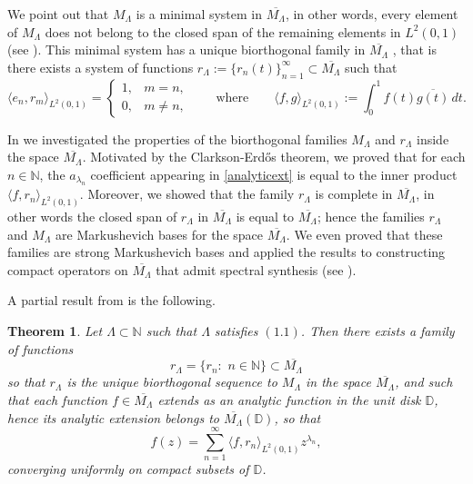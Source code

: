 \documentclass[11pt, a4paper]{article}
\newtheorem{theorem}{Theorem}[section]
\begin{document}
We point out that $M_{\Lambda}$ is a minimal system in $\overline{M_{\Lambda}}$, in other words,
every element of $M_{\Lambda}$ does not belong to the closed span of the remaining elements in $L^2 (0,1)$
(see \cite[Proposition 6.1.4]{Gurariy}). This minimal system has a unique biorthogonal family in $\overline{M_{\Lambda}}$ ,
that is there exists a system of functions
$r_{\Lambda}:=\{r_n(t)\}_{n=1}^{\infty}\subset \overline{M_{\Lambda}}$ such that
\[
\langle e_n, r_m\rangle_{L^2 (0,1)} =\begin{cases} 1, & m=n, \\  0, & m\not=n,\end{cases}\qquad \text{where}\qquad
\langle f, g\rangle_{L^2 (0,1)}:=\int_{0}^{1} f(t)\overline{g(t)}\, dt.
\]

In \cite[Theorem 1]{Zikkos2026Acta} we investigated the properties of the biorthogonal families $M_{\Lambda}$ and $r_{\Lambda}$
inside the space $\overline{M_{\Lambda}}$. Motivated by the Clarkson-Erd\H{o}s theorem, we proved that
for each $n\in\mathbb{N}$, the $a_{\lambda_n}$ coefficient appearing in \eqref{analyticext} is equal to the
inner product $\langle f, r_{n} \rangle_{L^2 (0,1)}$.
Moreover, we showed that the family  $r_{\Lambda}$ is complete in $\overline{M_{\Lambda}}$,
in other words the closed span of $r_{\Lambda}$ in $\overline{M_{\Lambda}}$ is equal to $\overline{M_{\Lambda}}$; hence the families
$r_{\Lambda}$ and $M_{\Lambda}$ are Markushevich bases for the space $\overline{M_{\Lambda}}$.
We even proved that these families are strong Markushevich bases and applied the results to constructing compact operators on $\overline{M_{\Lambda}}$ that admit spectral synthesis (see \cite[Theorems 2, 3, 4]{Zikkos2026Acta}).

A partial result from \cite[Theorem 1]{Zikkos2026Acta} is the following.
\begin{theorem}\label{biorthogonalsystem}
Let $\Lambda\subset\mathbb{N}$ such that $\Lambda$ satisfies $(1.1)$. Then there exists a family of functions
\[
r_{\Lambda}=\{r_{n}:\,\, n\in\mathbb{N}\}\subset \overline{M_{\Lambda}}
\]
so that $r_{\Lambda}$ is the unique biorthogonal sequence to $M_{\Lambda}$ in the space $\overline{M_{\Lambda}}$, and such that
each function $f\in \overline{M_{\Lambda}}$ extends as an analytic function in the unit disk $\mathbb{D}$,
hence its analytic extension belongs to $\overline{M_{\Lambda}}(\mathbb{D})$, so that
\begin{equation}\label{representationf}
f(z)=\sum_{n=1}^{\infty}\langle f, r_{n} \rangle_{L^2 (0,1)} z^{\lambda_n},
\end{equation}
converging uniformly on compact subsets of $\mathbb{D}$.
\end{theorem}
\end{document}
